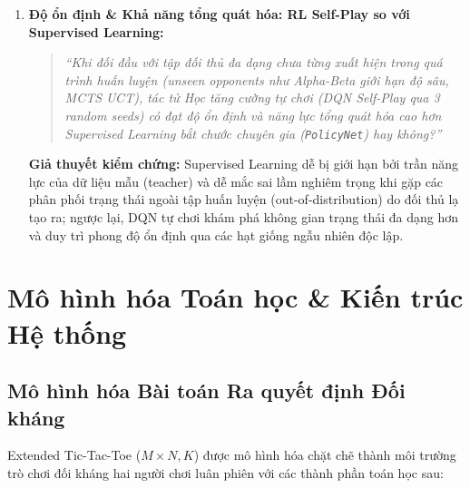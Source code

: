 \documentclass[a4paper,12pt]{report}
\begin{document}
\begin{enumerate}[label=\textbf{RQ\arabic*:}, leftmargin=1.5cm]
    \item \textbf{Độ ổn định \& Khả năng tổng quát hóa: RL Self-Play so với Supervised Learning:}
    \begin{quote}
        \textit{``Khi đối đầu với tập đối thủ đa dạng chưa từng xuất hiện trong quá trình huấn luyện (unseen opponents như Alpha-Beta giới hạn độ sâu, MCTS UCT), tác tử Học tăng cường tự chơi (DQN Self-Play qua 3 random seeds) có đạt độ ổn định và năng lực tổng quát hóa cao hơn Supervised Learning bắt chước chuyên gia (\texttt{PolicyNet}) hay không?''}
    \end{quote}
    \textbf{Giả thuyết kiểm chứng:} Supervised Learning dễ bị giới hạn bởi trần năng lực của dữ liệu mẫu (teacher) và dễ mắc sai lầm nghiêm trọng khi gặp các phân phối trạng thái ngoài tập huấn luyện (out-of-distribution) do đối thủ lạ tạo ra; ngược lại, DQN tự chơi khám phá không gian trạng thái đa dạng hơn và duy trì phong độ ổn định qua các hạt giống ngẫu nhiên độc lập.
\end{enumerate}

\clearpage
\section{Mô hình hóa Toán học \& Kiến trúc Hệ thống}

\subsection{Mô hình hóa Bài toán Ra quyết định Đối kháng}
Extended Tic-Tac-Toe ($M \times N, K$) được mô hình hóa chặt chẽ thành môi trường trò chơi đối kháng hai người chơi luân phiên với các thành phần toán học sau:
\end{document}
